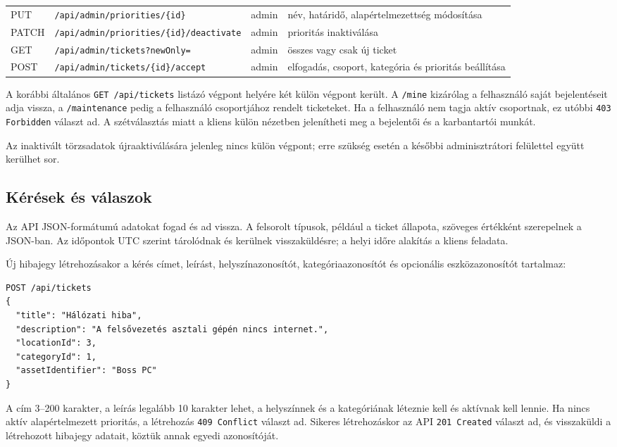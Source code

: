 \documentclass[12pt, a4paper, twoside]{article}
\begin{document}
{\begin{longtable}{>{\raggedright\arraybackslash}p{1.1cm}>{\raggedright\arraybackslash}p{6.9cm}>{\raggedright\arraybackslash}p{2.3cm}>{\raggedright\arraybackslash}p{4.3cm}}
    PUT & \texttt{/api/admin/priorities/\{id\}} & admin & név, határidő, alapértelmezettség módosítása \\
    PATCH & \texttt{/api/admin/priorities/\{id\}/deactivate} & admin & prioritás inaktiválása \\
    GET & \texttt{/api/admin/tickets?newOnly=} & admin & összes vagy csak új ticket \\
    POST & \texttt{/api/admin/tickets/\{id\}/accept} & admin & elfogadás, csoport, kategória és prioritás beállítása \\
\end{longtable}
}

A korábbi általános \texttt{GET /api/tickets} listázó végpont helyére két külön végpont került. A \texttt{/mine} kizárólag a felhasználó saját bejelentéseit adja vissza, a \texttt{/maintenance} pedig a felhasználó csoportjához rendelt ticketeket. Ha a felhasználó nem tagja aktív csoportnak, ez utóbbi \texttt{403 Forbidden} választ ad. A szétválasztás miatt a kliens külön nézetben jelenítheti meg a bejelentői és a karbantartói munkát.

Az inaktivált törzsadatok újraaktiválására jelenleg nincs külön végpont; erre szükség esetén a későbbi adminisztrátori felülettel együtt kerülhet sor.

\subsection{Kérések és válaszok}

Az API JSON-formátumú adatokat fogad és ad vissza. A felsorolt típusok, például a ticket állapota, szöveges értékként szerepelnek a JSON-ban. Az időpontok UTC szerint tárolódnak és kerülnek visszaküldésre; a helyi időre alakítás a kliens feladata.

Új hibajegy létrehozásakor a kérés címet, leírást, helyszínazonosítót, kategóriaazonosítót és opcionális eszközazonosítót tartalmaz:

\begin{verbatim}
POST /api/tickets
{
  "title": "Hálózati hiba",
  "description": "A felsővezetés asztali gépén nincs internet.",
  "locationId": 3,
  "categoryId": 1,
  "assetIdentifier": "Boss PC"
}
\end{verbatim}

A cím 3--200 karakter, a leírás legalább 10 karakter lehet, a helyszínnek és a kategóriának léteznie kell és aktívnak kell lennie. Ha nincs aktív alapértelmezett prioritás, a létrehozás \texttt{409 Conflict} választ ad. Sikeres létrehozáskor az API \texttt{201 Created} választ ad, és visszaküldi a létrehozott hibajegy adatait, köztük annak egyedi azonosítóját.
\end{document}

